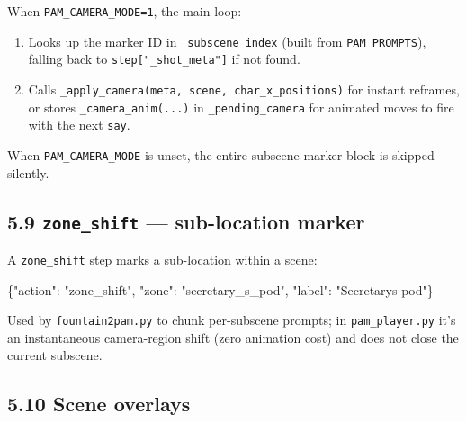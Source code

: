 \documentclass[
  11pt,
]{book}
\newenvironment{Shaded}{}{}
\newcommand{\DataTypeTok}[1]{\textcolor[rgb]{0.56,0.13,0.00}{#1}}
\newcommand{\FunctionTok}[1]{\textcolor[rgb]{0.02,0.16,0.49}{#1}}
\newcommand{\StringTok}[1]{\textcolor[rgb]{0.25,0.44,0.63}{#1}}
\providecommand{\tightlist}{%
  \setlength{\itemsep}{0pt}\setlength{\parskip}{0pt}}
\begin{document}
When \texttt{PAM\_CAMERA\_MODE=1}, the main loop:

\begin{enumerate}
\def\labelenumi{\arabic{enumi}.}
\tightlist
\item
  Looks up the marker ID in \texttt{\_subscene\_index} (built from
  \texttt{PAM\_PROMPTS}), falling back to
  \texttt{step{[}"\_shot\_meta"{]}} if not found.
\item
  Calls \texttt{\_apply\_camera(meta,\ scene,\ char\_x\_positions)} for
  instant reframes, or stores \texttt{\_camera\_anim(...)} in
  \texttt{\_pending\_camera} for animated moves to fire with the next
  \texttt{say}.
\end{enumerate}

When \texttt{PAM\_CAMERA\_MODE} is unset, the entire subscene-marker
block is skipped silently.

\subsection{\texorpdfstring{5.9 \texttt{zone\_shift} --- sub-location
marker}{5.9 zone\_shift --- sub-location marker}}\label{zone_shift-sub-location-marker}

A \texttt{zone\_shift} step marks a sub-location within a scene:

\begin{Shaded}
\begin{Highlighting}[]
\FunctionTok{\{}\DataTypeTok{"action"}\FunctionTok{:} \StringTok{"zone\_shift"}\FunctionTok{,} \DataTypeTok{"zone"}\FunctionTok{:} \StringTok{"secretary\_s\_pod"}\FunctionTok{,}
 \DataTypeTok{"label"}\FunctionTok{:} \StringTok{"Secretary\textquotesingle{}s pod"}\FunctionTok{\}}
\end{Highlighting}
\end{Shaded}

Used by \texttt{fountain2pam.py} to chunk per-subscene prompts; in
\texttt{pam\_player.py} it's an instantaneous camera-region shift (zero
animation cost) and does not close the current subscene.

\subsection{5.10 Scene overlays}\label{scene-overlays}
\end{document}

